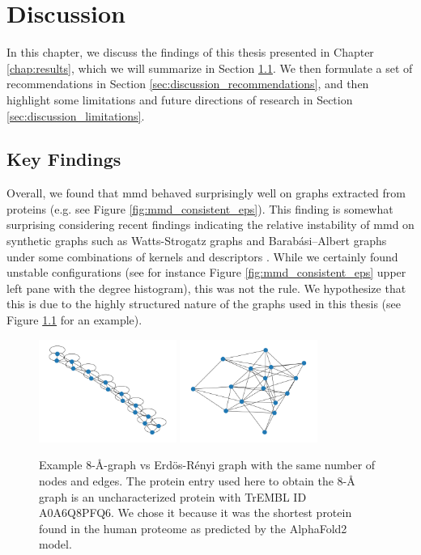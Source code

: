 \chapter{Discussion}\label{chap:discussion}

In this chapter, we discuss the findings of this thesis presented in Chapter
\ref{chap:results}, which we will summarize in Section \ref{sec:key_findings}.
We then formulate a set of recommendations in Section
\ref{sec:discussion_recommendations}, and then highlight some limitations and
future directions of research in Section \ref{sec:discussion_limitations}.

\section{Key Findings}\label{sec:key_findings}

Overall, we found that \acrshort{mmd} behaved surprisingly well on graphs extracted from
proteins (e.g. see Figure \ref{fig:mmd_consistent_eps}). This finding is
somewhat surprising considering recent findings indicating the relative
instability of \acrshort{mmd} on synthetic graphs such as Watts-Strogatz graphs and
Barabási–Albert graphs under some combinations of kernels and descriptors
\citep{o2021evaluation}. While we certainly found unstable configurations
(see for instance Figure \ref{fig:mmd_consistent_eps} upper left pane with the degree histogram),
this was not the rule. We hypothesize that this is due to the highly structured
nature of the graphs used in this thesis (see Figure
\ref{fig:er_comparison_8a_graph} for an example).

\begin{figure}
  \centering
  \includegraphics[width=0.4\textwidth]{./figures/results/8_a_graph.pdf}
  \includegraphics[width=0.4\textwidth]{./figures/results/er_graph_8_a_params.pdf}
  \caption[Example 8-\si{\angstrom}-graph vs Erd\"os-Rényi graph with the same
  number of nodes and edges.]{Example 8-\si{\angstrom}-graph vs Erd\"os-Rényi graph with the same
    number of nodes and edges. The protein entry used here to obtain the
    8-\si{\angstrom} graph is an uncharacterized protein with TrEMBL ID
    A0A6Q8PFQ6. We chose it because it was the shortest protein found in the
    human proteome as predicted by the AlphaFold2 model.}
  \label{fig:er_comparison_8a_graph}
\end{figure}

